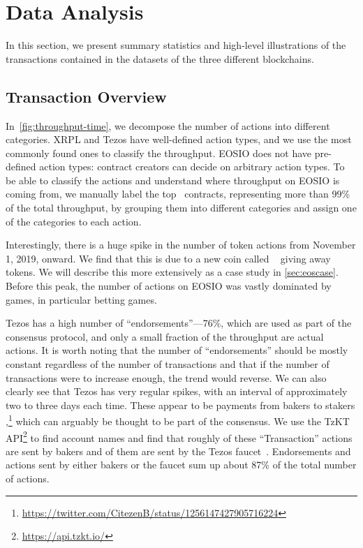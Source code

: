 \section{Data Analysis}
\label{sec:4:data-analysis}
In this section, we present summary statistics and high-level illustrations of the transactions contained in the datasets of the three different blockchains.

\subsection{Transaction Overview}


In~\autoref{fig:throughput-time}, we decompose the number of actions into different categories. XRPL and Tezos have well-defined action types, and we use the most commonly found ones to classify the throughput.
EOSIO does not have pre-defined action types: contract creators can decide on arbitrary action types.
To be able to classify the actions and understand where throughput on EOSIO is coming from, we manually label the top~ contracts, representing more than 99\% of the total throughput, by grouping them into different categories and assign one of the categories to each action.

Interestingly, there is a huge spike in the number of token actions from November 1, 2019, onward.
We find that this is due to a new coin called ~\cite{Enumivo2019} giving away tokens.
We will describe this more extensively as a case study in \autoref{sec:eoscase}.
Before this peak, the number of actions on EOSIO was vastly dominated by games, in particular betting games.

Tezos has a high number of ``endorsements''---76\%, which are used as part of the consensus protocol, and only a small fraction of the throughput are actual actions.
It is worth noting that the number of ``endorsements'' should be mostly constant regardless of the number of transactions and that if the number of transactions were to increase enough, the trend would reverse.
We can also clearly see that Tezos has very regular spikes, with an interval of approximately two to three days each time.
These appear to be payments from bakers to stakers \cite{cryptium-labs-payout},\footnote{\url{https://twitter.com/CitezenB/status/1256147427905716224}} which can arguably be thought to be part of the consensus.
We use the TzKT API\footnote{\url{https://api.tzkt.io/}} to find account names and find that roughly  of these ``Transaction'' actions are sent by bakers and  of them are sent by the Tezos faucet~\cite{tezos-faucet}.
Endorsements and actions sent by either bakers or the faucet sum up about 87\% of the total number of actions.

